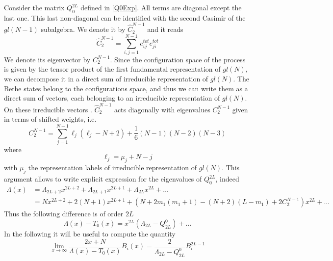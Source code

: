 \documentclass[10pt]{article}
\numberwithin{equation}{section}
\numberwithin{equation}{subsection}
\begin{document}
Consider the matrix $Q_{0}^{2L}$ defined in \eqref{Q0Exp}. All terms are diagonal except the last one. This last non-diagonal can be identified with the second Casimir of the $gl(N-1)$ subalgebra. We denote it by $\hat{C}_{2}^{N-1}$ and it reads
\begin{equation}
\hat C_2^{N-1}= \sum_{i,j=1}^{N-1}e_{ij}^{tot}e_{ji}^{tot}
\end{equation} 
We denote its eigenvector by $C_{2}^{N-1}$. Since the configuration space of the process is given by the tensor product of the first fundamental representation of $gl(N)$, we can decompose it in a direct sum of irreducible representation of $gl(N)$. The Bethe states belong to the configurations space, and thus we can write them as a direct sum of vectors, each belonging to an irreducible representation of $gl(N)$. On these irreducible vectors . $\hat{C}_{2}^{N-1}$ acts diagonally with eigenvalues $C_{2}^{N-1}$ given in terms of shifted weights, i.e. 
\begin{equation}
C_2^{N-1}=\sum_{j=1}^{N-1}\ell_j(\ell_j -N+2)+\frac{1}{6}(N-1)(N-2)(N-3)
\end{equation} 
 where 
 \begin{equation}
 	\ell_{j}=\mu_{j}+N-j
 \end{equation}
with $\mu_{j}$ the representation labels of irreducible representation of $gl(N)$. This argument allows to write explicit expression for the eigenvalues of $Q_{0}^{2L}$, indeed 
\begin{equation}
\begin{split}
\Lambda(x)&= \Lambda_{2L+2} x^{2L+2}+ \Lambda_{2L+1} x^{2L+1}+ \Lambda_{2L}x^{2L}+\ldots
\\&=N x^{2L+2}+2(N+1) x^{2L+1}+ \left(N+2m_1(m_1+1)-(N+2)(L-m_1)+2C_{2}^{N-1}\right)x^{2L}+\ldots
\end{split}
\end{equation} 
{\color{blue}
Thus the following difference is of order $2L$
\begin{equation}
\Lambda(x)-T_0(x)=x^{2L}\left(\Lambda_{2L}-Q_{2L}^0\right)+\ldots
\end{equation} 
In the following it will be useful to compute the quantity 
\begin{equation}
\lim_{x\to\infty}\frac{2x+N}{\Lambda(x)-T_0(x)}B_{i}(x)=\frac{2}{\Lambda_{2L}-Q_{2L}^0}B_i^{2L-1}
\end{equation} }
\end{document}
